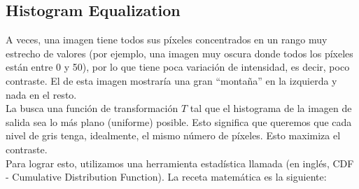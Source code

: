 \subsection{Histogram Equalization}
\noindent
A veces, una imagen tiene todos sus píxeles concentrados en un rango muy estrecho de valores (por ejemplo, una imagen muy oscura donde todos los píxeles están entre 0 y 50), por lo que tiene poca variación de intensidad, es decir, poco contraste. El  de esta imagen mostraría una gran ``montaña'' en la izquierda y nada en el resto. \\

\noindent
La  busca una función de transformación $T$ tal que el histograma de la imagen de salida sea lo más plano (uniforme) posible. Esto significa que queremos que cada nivel de gris tenga, idealmente, el mismo número de píxeles. Esto maximiza el contraste. \\
\noindent
Para lograr esto, utilizamos una herramienta estadística llamada  (en inglés, CDF - Cumulative Distribution Function). La receta matemática es la siguiente:

